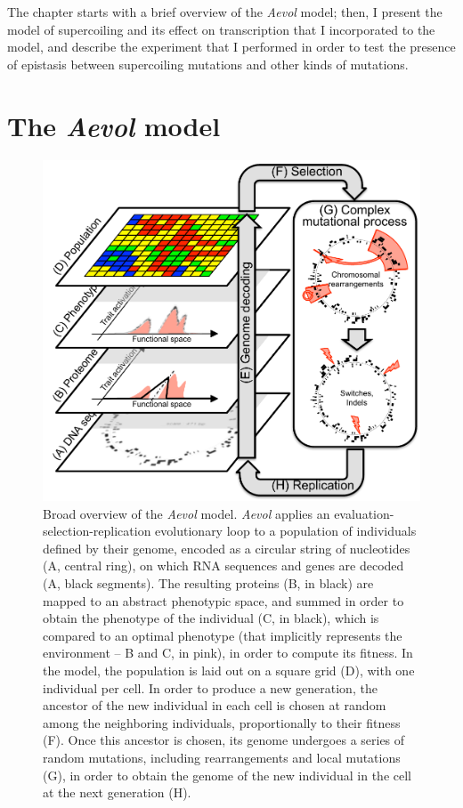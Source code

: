 The chapter starts with a brief overview of the \emph{Aevol} model; then, I present the model of supercoiling and its effect on transcription that I incorporated to the model, and describe the experiment that I performed in order to test the presence of epistasis between supercoiling mutations and other kinds of mutations.

\section{The \emph{Aevol} model}
\label{sec:aevol:model}

\begin{figure}
\includegraphics[width=\textwidth]{aevol/images/aevol.pdf}
\caption[Overview of the \emph{Aevol} model]{Broad overview of the \emph{Aevol} model.
\emph{Aevol} applies an evaluation-selection-replication evolutionary loop to a population of individuals defined by their genome, encoded as a circular string of nucleotides (A, central ring), on which RNA sequences and genes are decoded (A, black segments).
The resulting proteins (B, in black) are mapped to an abstract phenotypic space, and summed in order to obtain the phenotype of the individual (C, in black), which is compared to an optimal phenotype (that implicitly represents the environment -- B and C, in pink), in order to compute its fitness.
In the model, the population is laid out on a square grid (D), with one individual per cell.
In order to produce a new generation, the ancestor of the new individual in each cell is chosen at random among the neighboring individuals, proportionally to their fitness (F).
Once this ancestor is chosen, its genome undergoes a series of random mutations, including rearrangements and local mutations (G), in order to obtain the genome of the new individual in the cell at the next generation (H).
}
\label{fig:aevol:model}
\end{figure}

